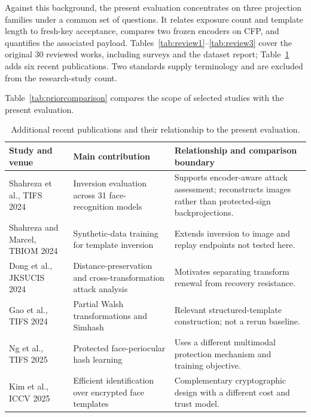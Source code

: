 Against this background, the present evaluation concentrates on three projection families under a common set of questions. It relates exposure count and template length to fresh-key acceptance, compares two frozen encoders on CFP, and quantifies the associated payload. Tables~\ref{tab:review1}--\ref{tab:review3} cover the original 30 reviewed works, including surveys and the dataset report; Table~\ref{tab:recent} adds six recent publications. Two standards supply terminology and are excluded from the research-study count.


Table~\ref{tab:priorcomparison} compares the scope of selected studies with the present evaluation.


\begin{table}[t]
\caption{Additional recent publications and their relationship to the present evaluation.}
\label{tab:recent}\centering\small
\begin{tabularx}{\textwidth}{@{}p{3.3cm}p{4.7cm}X@{}}\toprule
Study and venue & Main contribution & Relationship and comparison boundary\\\midrule
Shahreza et al., TIFS 2024~\cite{shahreza2024vulnerability} & Inversion evaluation across 31 face-recognition models & Supports encoder-aware attack assessment; reconstructs images rather than protected-sign backprojections.\\
Shahreza and Marcel, TBIOM 2024~\cite{shahreza2024synthetic} & Synthetic-data training for template inversion & Extends inversion to image and replay endpoints not tested here.\\
Dong et al., JKSUCIS 2024~\cite{dong2024risk} & Distance-preservation and cross-transformation attack analysis & Motivates separating transform renewal from recovery resistance.\\
Gao et al., TIFS 2024~\cite{gao2024walsh} & Partial Walsh transformations and Simhash & Relevant structured-template construction; not a rerun baseline.\\
Ng et al., TIFS 2025~\cite{ng2025flexible} & Protected face-periocular hash learning & Uses a different multimodal protection mechanism and training objective.\\
Kim et al., ICCV 2025~\cite{kim2025idface} & Efficient identification over encrypted face templates & Complementary cryptographic design with a different cost and trust model.\\\bottomrule
\end{tabularx}
\end{table}
